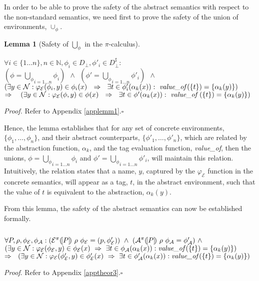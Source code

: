 \documentclass[10pt,a4paper,final,oneside,fleqn]{book}
\begin{document}
\noindent
In order to be able to prove the safety of the abstract semantics with respect to the non-standard semantics, we need first to prove the safety of the union of environments, $\cup_\phi$.
\newtheorem{lema}{Lemma}
\begin{lema}[Safety of $\bigcup_\phi$ in the $\pi$-calculus]\label{lemm1}
$ $

\noindent
$\forall i\in \{1\ldots n\},n\in\mathbb{N},\phi_i\in D_\bot,\phi'_i\in D^\sharp_\bot:$\\
$(\phi=\underset{i=1\ldots n}{\bigcup_\phi}\phi_i)~~\wedge~~(\phi'=\underset{i=1\ldots n}{\bigcup_\phi}\phi'_i)~~\wedge$\\
$(\exists y\in\mathcal{N}:\varphi_\mathcal{E}(\phi_i,y)\in\phi_i(x)~~\Rightarrow~~\exists t\in\phi'_i(\alpha_k(x)):~\mbox{{\itshape value\_of\/}}(\{t\})=\{\alpha_k(y)\})$\\
\noindent
$\Rightarrow~~~(\exists y\in\mathcal{N}:\varphi_\mathcal{E}(\phi,y)\in\phi(x)~~\Rightarrow~~\exists t\in\phi'(\alpha_k(x)):~\mbox{{\itshape value\_of \/}}(\{t\})=\{\alpha_k(y)\})$
\end{lema}
\noindent
{\itshape Proof.\/} Refer to Appendix \ref{applemm1}.\hfill$\square$\vspace{5mm}


\noindent
Hence, the lemma establishes that for any set of concrete environments, $\{\phi_1,\ldots,\phi_n\}$, and their abstract counterparts, $\{\phi'_1,\ldots,\phi'_n\}$, which are related by the abstraction function, $\alpha_k$, and the tag evaluation function, {\itshape value\_of\/}, then the unions, $\phi=\underset{i=1\ldots n}{\bigcup_\phi}\phi_i$ and $\phi'=\underset{i=1\ldots n}{\bigcup_\phi}\phi'_i$, will maintain this relation.  Intuitively, the relation states that a name, $y$, captured by the $\varphi_\mathcal{E}$ function in the concrete semantics, will appear as a tag, $t$, in the abstract environment, such that the value of $t$ is equivalent to the abstraction, $\alpha_k(y)$.

From this lemma, the safety of the abstract semantics can now be established formally.

\begin{theor}\label{theor3}
$ $

\noindent
$\forall P, \rho, \phi_\mathcal{E}, \phi_\mathcal{A}:\\
(\mathcal{E}^\pi(\![P]\!)~\rho~\phi_\mathcal{E}=(p,\phi'_\mathcal{E}))~\wedge~(\mathcal{A}^\pi(\![P]\!)~\rho~\phi_\mathcal{A}=\phi'_\mathcal{A})~\wedge$\\
$(\exists y\in\mathcal{N}:\varphi_\mathcal{E}(\phi_\mathcal{E},y)\in\phi_\mathcal{E}(x)~\Rightarrow~\exists t\in\phi_\mathcal{A}(\alpha_k(x)):\mbox{{\itshape value\_of\/}}(\{t\})=\{\alpha_k(y)\})$\\
\noindent
$\Rightarrow~~(\exists y\in\mathcal{N}:\varphi_\mathcal{E}(\phi'_\mathcal{E},y)\in\phi'_\mathcal{E}(x)~\Rightarrow~\exists t\in\phi'_\mathcal{A}(\alpha_k(x)):\mbox{{\itshape value\_of\/}}(\{t\})=\{\alpha_k(y)\})$
\end{theor}
\noindent
{\itshape Proof\/}. Refer to Appendix \ref{apptheor3}.\hfill$\square$\vspace{5mm}
\end{document}
